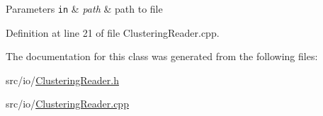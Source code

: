 \begin{DoxyParams}[1]{Parameters}
\mbox{\tt in}  & {\em path} & path to file \\
\hline
\end{DoxyParams}


Definition at line 21 of file Clustering\-Reader.\-cpp.



The documentation for this class was generated from the following files\-:\begin{DoxyCompactItemize}
\item 
src/io/\hyperlink{_clustering_reader_8h}{Clustering\-Reader.\-h}\item 
src/io/\hyperlink{_clustering_reader_8cpp}{Clustering\-Reader.\-cpp}\end{DoxyCompactItemize}
